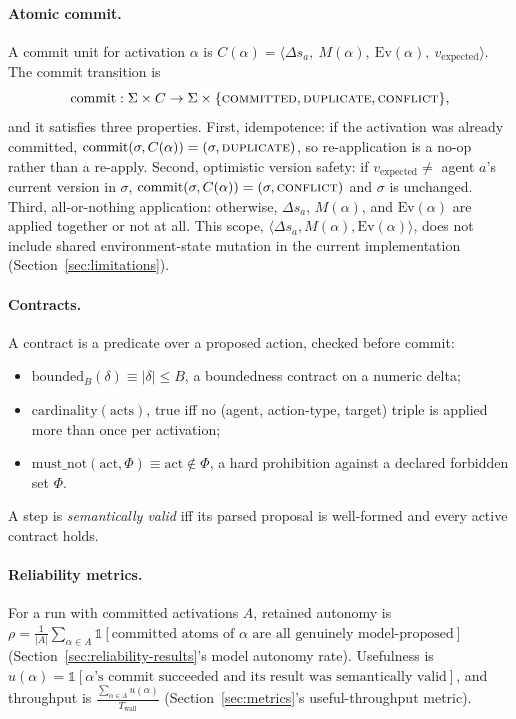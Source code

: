 \paragraph{Atomic commit.}
A commit unit for activation $\alpha$ is $C(\alpha) = \langle \Delta s_a,\ M(\alpha),\ \mathrm{Ev}(\alpha),\ v_{\text{expected}} \rangle$. The commit transition is
\[
\mathrm{commit}: \Sigma \times C \to \Sigma \times \{\textsc{committed}, \textsc{duplicate}, \textsc{conflict}\},
\]
and it satisfies three properties. First, idempotence: if the activation was already committed, $\mathrm{commit}(\sigma, C(\alpha)) = (\sigma, \textsc{duplicate})$, so re-application is a no-op rather than a re-apply. Second, optimistic version safety: if $v_{\text{expected}} \ne$ agent $a$'s current version in $\sigma$, $\mathrm{commit}(\sigma, C(\alpha)) = (\sigma, \textsc{conflict})$ and $\sigma$ is unchanged. Third, all-or-nothing application: otherwise, $\Delta s_a$, $M(\alpha)$, and $\mathrm{Ev}(\alpha)$ are applied together or not at all. This scope, $\langle \Delta s_a, M(\alpha), \mathrm{Ev}(\alpha)\rangle$, does not include shared environment-state mutation in the current implementation (Section~\ref{sec:limitations}).

\paragraph{Contracts.}
A contract is a predicate over a proposed action, checked before commit:
\begin{itemize}
  \item $\mathrm{bounded}_B(\delta) \equiv |\delta| \le B$, a boundedness contract on a numeric delta;
  \item $\mathrm{cardinality}(\mathrm{acts})$, true iff no (agent, action-type, target) triple is applied more than once per activation;
  \item $\mathrm{must\_not}(\mathrm{act}, \Phi) \equiv \mathrm{act} \notin \Phi$, a hard prohibition against a declared forbidden set $\Phi$.
\end{itemize}
A step is \emph{semantically valid} iff its parsed proposal is well-formed and every active contract holds.

\paragraph{Reliability metrics.}
For a run with committed activations $A$, retained autonomy is
$\rho = \frac{1}{|A|}\sum_{\alpha \in A} \mathbb{1}[\text{committed atoms of } \alpha \text{ are all genuinely model-proposed}]$
(Section~\ref{sec:reliability-results}'s model autonomy rate). Usefulness is $u(\alpha) = \mathbb{1}[\alpha\text{'s commit succeeded and its result was semantically valid}]$, and throughput is $\frac{\sum_{\alpha \in A} u(\alpha)}{T_{\text{wall}}}$ (Section~\ref{sec:metrics}'s useful-throughput metric).

